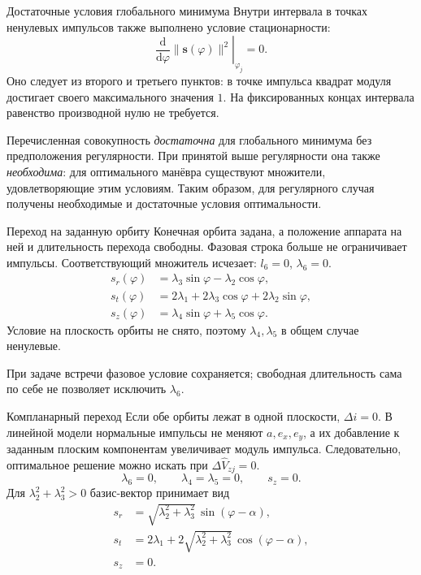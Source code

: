 \documentclass[11pt,aspectratio=169,t]{beamer}
\newcommand{\eqcompact}{\fontsize{10}{12}\selectfont}
\begin{document}
\begin{frame}{Достаточные условия глобального минимума}
\relax
\derivationmathspacing
\justifying
Внутри интервала в точках ненулевых импульсов также выполнено
условие стационарности:
{\eqcompact\derivationmathspacing
\[
\left.\frac{\mathrm d}{\mathrm d\varphi}\|\boldsymbol s(\varphi)\|^2
          \right|_{\varphi_j}=0.
\]
}
Оно следует из второго и третьего пунктов: в точке импульса
квадрат модуля достигает своего максимального значения $1$.
На фиксированных концах интервала равенство производной нулю
не требуется.

Перечисленная совокупность \emph{достаточна} для глобального
минимума без предположения регулярности. При принятой выше
регулярности она также \emph{необходима}: для оптимального
манёвра существуют множители, удовлетворяющие этим условиям.
Таким образом, для регулярного случая получены необходимые
и достаточные условия оптимальности.
\end{frame}

\begin{frame}{Переход на заданную орбиту}
\relax
\derivationmathspacing
\justifying
Конечная орбита задана, а положение аппарата на ней и длительность
перехода свободны. Фазовая строка больше не ограничивает
импульсы. Соответствующий множитель исчезает:
$l_6=0$, $\lambda_6=0$.
{\derivationmathspacing
\[
\boxed{\begin{aligned}
 s_r(\varphi)&=\lambda_3\sin\varphi-\lambda_2\cos\varphi,\\
 s_t(\varphi)&=2\lambda_1+2\lambda_3\cos\varphi+2\lambda_2\sin\varphi,\\
 s_z(\varphi)&=\lambda_4\sin\varphi+\lambda_5\cos\varphi.
\end{aligned}}
\]
}
\medskip
\justifying
Условие на плоскость орбиты не снято, поэтому
$\lambda_4,\lambda_5$ в общем случае ненулевые.
\par\smallskip
При задаче встречи фазовое условие сохраняется;
свободная длительность сама по себе не позволяет исключить $\lambda_6$.
\end{frame}

\begin{frame}{Компланарный переход}
\relax
\derivationmathspacing
\justifying
Если обе орбиты лежат в одной плоскости, $\Delta i=0$.
В линейной модели нормальные импульсы не меняют $a,e_x,e_y$,
а их добавление к заданным плоским компонентам увеличивает
модуль импульса. Следовательно, оптимальное решение можно
искать при $\Delta\widehat V_{zj}=0$.
{\derivationmathspacing
\[
\lambda_6=0,\qquad \lambda_4=\lambda_5=0,\qquad s_z=0.
\]
}
Для $\lambda_2^2+\lambda_3^2>0$ базис-вектор принимает вид
{\derivationmathspacing
\[
\boxed{\begin{aligned}
 s_r&=\sqrt{\lambda_2^2+\lambda_3^2}\,\sin(\varphi-\alpha),\\
 s_t&=2\lambda_1+2\sqrt{\lambda_2^2+\lambda_3^2}\,
                         \cos(\varphi-\alpha),\\
 s_z&=0.
\end{aligned}}
\]
}
\end{frame}
\end{document}
